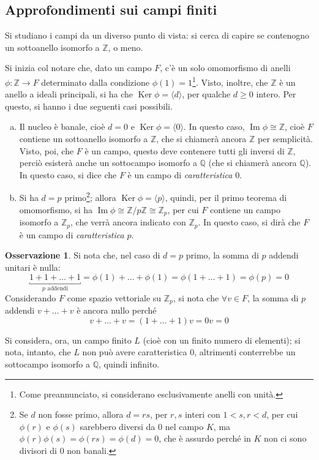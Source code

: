 \documentclass[11pt, a4paper]{scrartcl}
\theoremstyle{definition}
\numberwithin{esempio}{section}
\theoremstyle{definition}
\newtheorem{obs}{Osservazione}
\numberwithin{obs}{section}
\numberwithin{nota}{section}
\numberwithin{equation}{subsection}
\begin{document}
\subsection{Approfondimenti sui campi finiti}
Si studiano i campi da un diverso punto di vista: si cerca di capire se contenogno un sottoanello isomorfo a $\mathbb{Z}$, o meno.

Si inizia col notare che, dato un campo $F$, c'\`e un solo omomorfismo di anelli $\phi : \mathbb{Z}\to F$ determinato dalla condizione $\phi (1) = 1$\footnote{Come preannunciato, si considerano esclusivamente anelli con unit\`a.}.
Visto, inoltre, che $\mathbb{Z}$ \`e un anello a ideali principali, si ha che $\operatorname{Ker} \phi  = \langle d \rangle$, per qualche $d\ge 0$ intero.
Per questo, si hanno i due seguenti casi possibili.
\begin{enumerate}[(a).]
	\item Il nucleo \`e banale, cio\`e $d=0$ e $\operatorname{Ker} \phi = \langle 0 \rangle$. 
		In questo caso, $\operatorname{Im} \phi \cong \mathbb{Z}$, cio\`e $F$ contiene un sottoanello isomorfo a $\mathbb{Z}$, che si chiamer\`a ancora $\mathbb{Z}$ per semplicit\`a.
		Visto, poi, che $F$ \`e un campo, questo deve contenere tutti gli inversi di $\mathbb{Z}$, perci\`o esister\`a anche un sottocampo isomorfo a $\mathbb{Q}$ (che si chiamer\`a ancora $\mathbb{Q}$).
		In questo caso, si dice che $F$ \`e un campo di \textit{caratteristica} $0$.
	\item Si ha $d=p$ primo\footnote{Se $d$ non fosse primo, allora $d=rs$, per $r,s$ interi con $1<s,r<d$, per cui $\phi (r)$ e $\phi (s)$ sarebbero diversi da $0$ nel campo $K$, ma $\phi (r)\phi (s) = \phi (rs) = \phi (d) = 0$, che \`e assurdo perch\'e in $K$ non ci sono divisori di $0$ non banali.}; allora $\operatorname{Ker} \phi = \langle p \rangle$, quindi, per il primo teorema di omomorfismo, si ha $\operatorname{Im} \phi \cong \mathbb{Z} /p\mathbb{Z} \cong \mathbb{Z}_p$, per cui $F$ contiene un campo isomorfo a $\mathbb{Z}_p$, che verr\`a ancora indicato con $\mathbb{Z}_p$.
		In questo caso, si dir\`a che $F$ \`e un campo di \textit{caratteristica} $p$.
\end{enumerate}
\begin{obs}
	Si nota che, nel caso di $d=p$ primo, la somma di $p$ addendi unitari \`e nulla:
	\[
		\underbracket{1+ 1+  \ldots + 1}_{p \text{ addendi}} = \phi (1) + \ldots + \phi (1) = \phi (1+\ldots+1) = \phi (p) = 0
	\] 
	Considerando $F$ come spazio vettoriale su $\mathbb{Z}_p$, si nota che $\forall v \in F$, la somma di $p$ addendi $v + \ldots + v$ \`e ancora nullo perch\'e
	\[
	v + \ldots + v = (1 + \ldots + 1) v = 0 v = 0
	\] 
\end{obs}
\noindent Si considera, ora, un campo finito $L$ (cio\`e con un finito numero di elementi); si nota, intanto, che $L$ non pu\`o avere caratteristica $0$, altrimenti conterrebbe un sottocampo isomorfo a $\mathbb{Q}$, quindi infinito.
\end{document}
